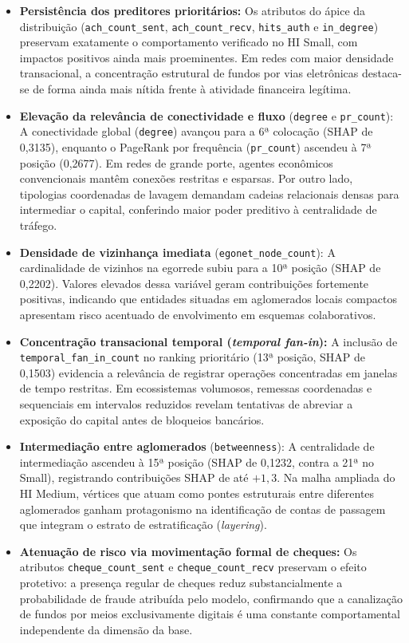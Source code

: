 \documentclass[a4paper,12pt,oneside,onecolumn,final,fleqn]{repUERJ}
\begin{document}
\begin{itemize}
    \item \textbf{Persistência dos preditores prioritários:} Os atributos do ápice da distribuição (\texttt{ach\_count\_sent}, \texttt{ach\_count\_recv}, \texttt{hits\_auth} e \texttt{in\_degree}) preservam exatamente o comportamento verificado no HI Small, com impactos positivos ainda mais proeminentes. Em redes com maior densidade transacional, a concentração estrutural de fundos por vias eletrônicas destaca-se de forma ainda mais nítida frente à atividade financeira legítima.

    \item \textbf{Elevação da relevância de conectividade e fluxo} (\texttt{degree} e \texttt{pr\_count}): A conectividade global (\texttt{degree}) avançou para a 6ª colocação (SHAP de 0,3135), enquanto o PageRank por frequência (\texttt{pr\_count}) ascendeu à 7ª posição (0,2677). Em redes de grande porte, agentes econômicos convencionais mantêm conexões restritas e esparsas. Por outro lado, tipologias coordenadas de lavagem demandam cadeias relacionais densas para intermediar o capital, conferindo maior poder preditivo à centralidade de tráfego.

    \item \textbf{Densidade de vizinhança imediata} (\texttt{egonet\_node\_count}): A cardinalidade de vizinhos na egorrede subiu para a 10ª posição (SHAP de 0,2202). Valores elevados dessa variável geram contribuições fortemente positivas, indicando que entidades situadas em aglomerados locais compactos apresentam risco acentuado de envolvimento em esquemas colaborativos.

    \item \textbf{Concentração transacional temporal (\textit{temporal fan-in}):} A inclusão de \texttt{temporal\_fan\_in\_count} no ranking prioritário (13ª posição, SHAP de 0,1503) evidencia a relevância de registrar operações concentradas em janelas de tempo restritas. Em ecossistemas volumosos, remessas coordenadas e sequenciais em intervalos reduzidos revelam tentativas de abreviar a exposição do capital antes de bloqueios bancários.

    \item \textbf{Intermediação entre aglomerados} (\texttt{betweenness}): A centralidade de intermediação ascendeu à 15ª posição (SHAP de 0,1232, contra a 21ª no Small), registrando contribuições SHAP de até $+1{,}3$. Na malha ampliada do HI Medium, vértices que atuam como pontes estruturais entre diferentes aglomerados ganham protagonismo na identificação de contas de passagem que integram o estrato de estratificação (\textit{layering}).

    \item \textbf{Atenuação de risco via movimentação formal de cheques:} Os atributos \texttt{cheque\_count\_sent} e \texttt{cheque\_count\_recv} preservam o efeito protetivo: a presença regular de cheques reduz substancialmente a probabilidade de fraude atribuída pelo modelo, confirmando que a canalização de fundos por meios exclusivamente digitais é uma constante comportamental independente da dimensão da base.
\end{itemize}
\end{document}
